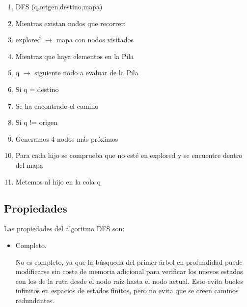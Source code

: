 \documentclass[conference]{IEEEtran}
\begin{document}
{\begin{enumerate}
\item DFS (q,origen,destino,mapa)
\item \hspace{1cm} Mientras existan nodos que recorrer:
\item \hspace{1cm} explored \(\rightarrow\) mapa con nodos visitados
\item \hspace{1cm} Mientras que haya elementos en la Pila
\item \hspace{1cm} q $\rightarrow$ siguiente nodo a evaluar de la Pila
\item \hspace{1cm} Si q = destino
\item \hspace{2cm} Se ha encontrado el camino
\item \hspace{1cm} Si q != origen
\item \hspace{2cm} Generamos 4 nodos m\'as pr\'oximos
\item \hspace{1cm} Para cada hijo se comprueba que no est\'e en explored  y se encuentre dentro del mapa
\item \hspace{1cm} Metemos al hijo en la cola q
\end{enumerate}

\subsection{Propiedades}    %


Las propiedades del algoritmo DFS son:

{\setlength{\parskip}{1em}
\begin{itemize}


\item Completo. 

No es completo, ya que la b\'usqueda del primer \'arbol en profundidad puede modificarse sin coste de memoria adicional para verificar los nuevos estados con los de la ruta desde el nodo ra\'iz hasta el nodo actual. Esto evita bucles infinitos en espacios de estados finitos, pero no evita que se creen caminos redundantes.


{\setlength{\parskip}{1em}

}
\end{itemize}}}
\end{document}
